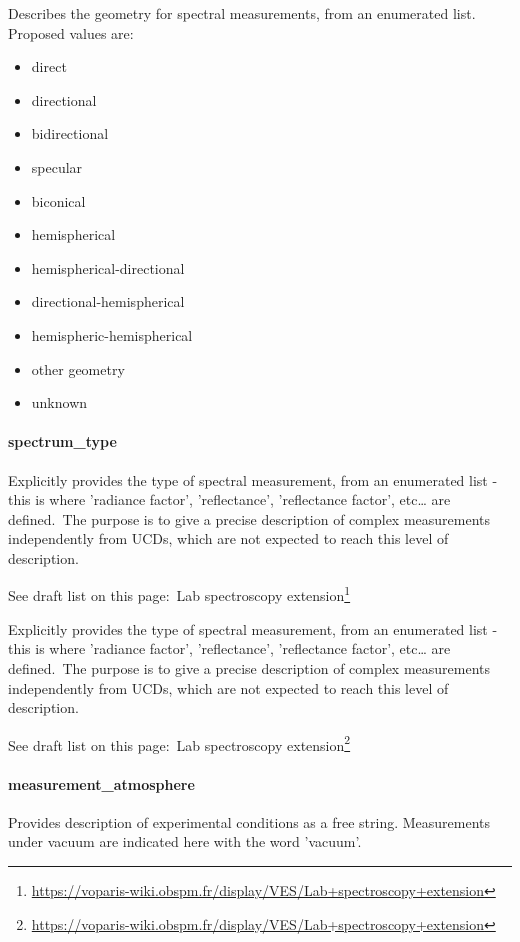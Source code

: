 \documentclass[11pt,a4paper]{ivoa}
\begin{document}
Describes the geometry for spectral measurements, from an enumerated list. Proposed values are:

\begin{itemize}
\item direct
\item directional
\item bidirectional
\item specular
\item biconical
\item hemispherical
\item hemispherical-directional
\item directional-hemispherical
\item hemispheric-hemispherical
\item other geometry
\item unknown
\end{itemize}

\paragraph{spectrum\_type}

Explicitly provides the type of spectral measurement, from an enumerated list - this is where 'radiance factor', 'reflectance', 'reflectance factor', etc… are defined. The purpose is to give a precise description of complex measurements independently from UCDs, which are not expected to reach this level of description.

See draft list on this page: Lab spectroscopy extension\footnote{\url{https://voparis-wiki.obspm.fr/display/VES/Lab+spectroscopy+extension}}

Explicitly provides the type of spectral measurement, from an enumerated list - this is where 'radiance factor', 'reflectance', 'reflectance factor', etc… are defined. The purpose is to give a precise description of complex measurements independently from UCDs, which are not expected to reach this level of description.

See draft list on this page: Lab spectroscopy extension\footnote{\url{https://voparis-wiki.obspm.fr/display/VES/Lab+spectroscopy+extension}}

\paragraph{measurement\_atmosphere}

Provides description of experimental conditions as a free string. Measurements under vacuum are indicated here with the word 'vacuum'.
\end{document}
